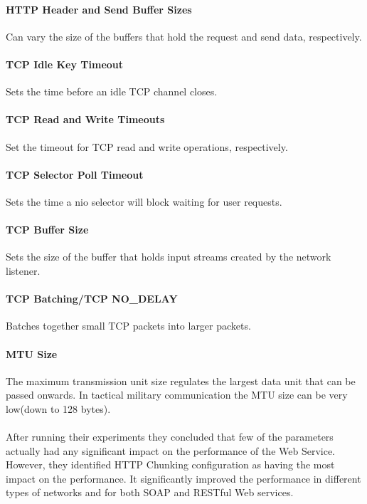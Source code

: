 \paragraph{HTTP Header and Send Buffer Sizes} Can vary the size of the buffers
that hold the request and send data, respectively.

\paragraph{TCP Idle Key Timeout} Sets the time before an idle TCP channel
closes.

\paragraph{TCP Read and Write Timeouts} Set the timeout for TCP read and write
operations, respectively.

\paragraph{TCP Selector Poll Timeout} Sets the time a \gls{nio} selector will
block waiting for user requests.

\paragraph{TCP Buffer Size} Sets the size of the buffer that holds input streams
created by the network listener.

\paragraph{TCP Batching/TCP NO\_DELAY} Batches together small TCP packets into
larger packets.

\paragraph{MTU Size} The maximum transmission unit size regulates the largest
data unit that can be passed onwards. In tactical military communication the MTU
size can be very low(down to 128 bytes).

\paragraph{}
After running their experiments they concluded that few of the parameters
actually had any significant impact on the performance of the Web Service.
However, they identified HTTP Chunking configuration as having the most impact
on the performance. It significantly improved the performance in different types
of networks and for both SOAP and RESTful Web services.


